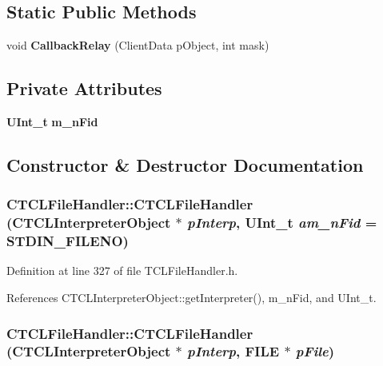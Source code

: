 \subsection*{Static Public Methods}
\begin{CompactItemize}
\item 
void {\bf Callback\-Relay} (Client\-Data p\-Object, int mask)
\end{CompactItemize}
\subsection*{Private Attributes}
\begin{CompactItemize}
\item 
{\bf UInt\_\-t} {\bf m\_\-n\-Fid}
\end{CompactItemize}


\subsection{Constructor \& Destructor Documentation}
\subsubsection{\setlength{\rightskip}{0pt plus 5cm}CTCLFile\-Handler::CTCLFile\-Handler ({\bf CTCLInterpreter\-Object} $\ast$ {\em p\-Interp}, {\bf UInt\_\-t} {\em am\_\-n\-Fid} = STDIN\_\-FILENO)\hspace{0.3cm}{\tt  [inline]}}\label{classCTCLFileHandler_a0}




Definition at line 327 of file TCLFile\-Handler.h.

References CTCLInterpreter\-Object::get\-Interpreter(), m\_\-n\-Fid, and UInt\_\-t.
\subsubsection{\setlength{\rightskip}{0pt plus 5cm}CTCLFile\-Handler::CTCLFile\-Handler ({\bf CTCLInterpreter\-Object} $\ast$ {\em p\-Interp}, FILE $\ast$ {\em p\-File})\hspace{0.3cm}{\tt  [inline]}}\label{classCTCLFileHandler_a1}




